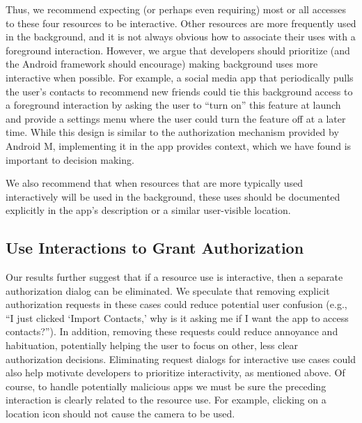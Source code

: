Thus, we recommend expecting (or perhaps even requiring) most or all
accesses to these four resources to be interactive.  Other
resources are more frequently used in the background, and it is not
always obvious how to associate their uses with a foreground
interaction. However, we argue that developers should prioritize (and
the Android framework should encourage) making background uses
more interactive when possible.  For example, a social media app that periodically 
pulls the user's contacts to recommend new friends could tie this background
access to a foreground interaction by asking the user to ``turn on'' this feature 
at launch and provide a settings menu where the user could turn the feature off
at a later time. 
While this design is similar to the authorization mechanism 
provided by Android M, implementing it in the app provides context, which 
we have found is important to decision making.

We also recommend that when resources that are more typically used interactively 
will be used in the background, these uses should be
documented explicitly in the app's description or a similar
user-visible location.


\subsection{Use Interactions to Grant Authorization}

Our results further suggest that if a resource use is interactive, then a separate
authorization dialog can be eliminated.  We speculate that removing
explicit authorization requests in these cases could reduce potential user 
confusion (e.g., ``I just clicked `Import Contacts,' why is it asking 
me if I want the app to access contacts?''). In addition, removing 
these requests could reduce annoyance and habituation, 
potentially helping the user to focus on other, less clear 
authorization decisions. Eliminating request dialogs for interactive 
use cases could also help motivate developers to prioritize 
interactivity, as mentioned above.  
Of course, to handle potentially malicious apps we must be sure the
preceding interaction is clearly related to the resource use.
For example, clicking on a location icon
should not cause the camera to be used. 


